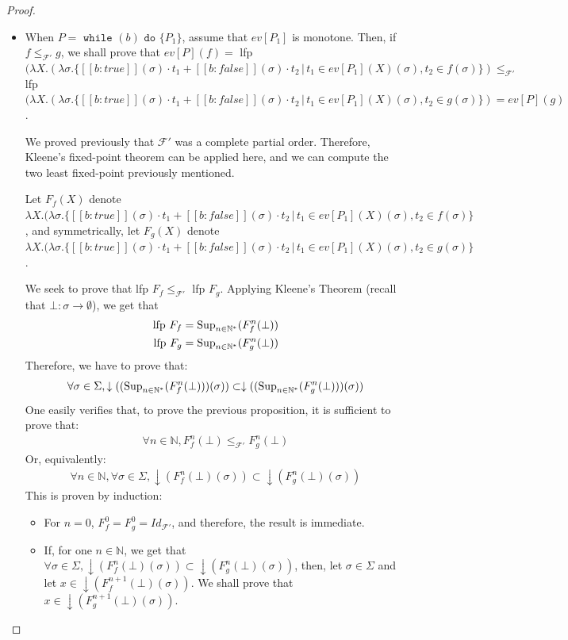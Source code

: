 \documentclass[a4paper,10pt]{llncs}
\def\NN {{\mathbb N}}
\def\Sup {\textnormal {Sup}}
\begin{document}
\begin{proof}
\begin{itemize}
\item When $P = \texttt{ while }(b)\texttt{ do }\{P_1\}$, assume that $ev[P_1]$ is monotone. Then, if $f \leq_{\mathcal{F}'} g$, we shall prove that $ev[P](f) =$ lfp $(\lambda X. (\lambda \sigma. \{[\![b : true ]\!](\sigma)\cdot t_1 + [\![b : false ]\!](\sigma)\cdot t_2 \,|\, t_1 \in ev[P_1](X)(\sigma), t_2 \in f(\sigma) \}) \leq_{\mathcal{F}'}$ lfp $(\lambda X. (\lambda \sigma. \{[\![b : true ]\!](\sigma)\cdot t_1 + [\![b : false ]\!](\sigma)\cdot t_2 \,|\, t_1 \in ev[P_1](X)(\sigma), t_2 \in g(\sigma) \}) =ev[P](g)$. \bigskip

We proved previously that $\mathcal{F}'$ was a complete partial order. Therefore, Kleene's fixed-point theorem can be applied here, and we can compute the two least fixed-point previously mentioned.\bigskip

Let $F_f(X)$ denote $\lambda X. (\lambda \sigma. \{[\![b : true ]\!](\sigma)\cdot t_1 + [\![b : false ]\!](\sigma)\cdot t_2 \,|\, t_1 \in ev[P_1](X)(\sigma), t_2 \in f(\sigma) \}$, and symmetrically, let $F_g(X)$ denote $\lambda X. (\lambda \sigma. \{[\![b : true ]\!](\sigma)\cdot t_1 + [\![b : false ]\!](\sigma)\cdot t_2 \,|\, t_1 \in ev[P_1](X)(\sigma), t_2 \in g(\sigma) \}$.\bigskip

We seek to prove that lfp $F_f \leq_{\mathcal{F}'} $ lfp $ F_g$. Applying Kleene's Theorem (recall that $\bot : \sigma \rightarrow \emptyset$), we get that 
\begin{align*}
\textnormal{lfp } F_f = \Sup_{n \in \NN^*}(F_f^n(\bot)) \\
\textnormal{lfp } F_g = \Sup_{n \in \NN^*}(F_g^n(\bot))
\end{align*}
Therefore, we have to prove that:
\begin{align*}
\forall \sigma \in \Sigma, \downarrow ((\Sup_{n \in \NN^*}(F_f^n(\bot)))(\sigma)) \subset  \downarrow ((\Sup_{n \in \NN^*}(F_g^n(\bot)))(\sigma)) 
\end{align*}
One easily verifies that, to prove the previous proposition, it is sufficient to prove that:
\begin{align*}
\forall n \in \NN, F_f^n(\bot) \leq_{\mathcal{F}'} F_g^n(\bot)
\end{align*}
Or, equivalently:
\begin{align*}
\forall n \in \NN, \forall \sigma \in \Sigma, \downarrow(F_f^n(\bot)(\sigma)) \subset \downarrow(F_g^n(\bot)(\sigma))
\end{align*}
This is proven by induction:
\begin{itemize}
\item For $n = 0$, $F_f^0 = F_g^0 = Id_{\mathcal{F}'}$, and therefore, the result is immediate.
\item If, for one $n \in \NN$, we get that $\forall \sigma \in \Sigma, \downarrow(F_f^n(\bot)(\sigma)) \subset \downarrow(F_g^n(\bot)(\sigma))$, then, let $\sigma \in \Sigma$ and let $x \in \downarrow(F_f^{n+1}(\bot)(\sigma))$. We shall prove that $x \in \downarrow(F_g^{n+1}(\bot)(\sigma))$.\bigskip


\end{itemize}
\end{itemize}
\end{proof}
\end{document}
